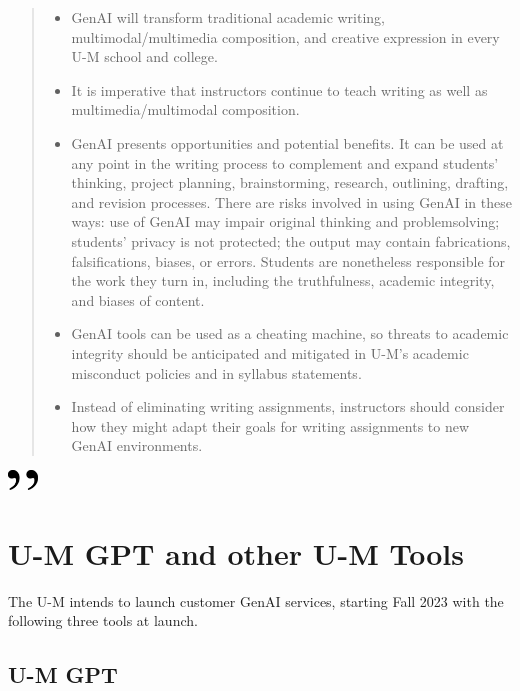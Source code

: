 \documentclass[
]{book}
\begin{document}
\begin{quote}
\begin{itemize}
\item
  GenAI will transform traditional academic writing, multimodal/multimedia composition, and creative expression in every U-M school and college.
\item
  It is imperative that instructors continue to teach writing as well as multimedia/multimodal composition.
\item
  GenAI presents opportunities and potential benefits. It can be used at any point in the writing process to complement and expand students' thinking, project planning, brainstorming, research, outlining, drafting, and revision processes. There are risks involved in using GenAI in these ways: use of GenAI may impair original thinking and problemsolving; students' privacy is not protected; the output may contain fabrications, falsifications, biases, or errors. Students are nonetheless responsible for the work they turn in, including the truthfulness, academic integrity, and biases of content.
\item
  GenAI tools can be used as a cheating machine, so threats to academic integrity should be anticipated and mitigated in U-M's academic misconduct policies and in syllabus statements.
\item
  Instead of eliminating writing assignments, instructors should consider how they might adapt their goals for writing assignments to new GenAI environments.
\end{itemize}
\end{quote}

\includegraphics[width=0.3125in,height=0.20833in]{close.png}

\hypertarget{u-m-gpt-and-other-u-m-tools}{%
\section{U-M GPT and other U-M Tools}\label{u-m-gpt-and-other-u-m-tools}}

The U-M intends to launch customer GenAI services, starting Fall 2023 with the following three tools at launch.

\hypertarget{u-m-gpt}{%
\subsection{U-M GPT}\label{u-m-gpt}}
\end{document}
